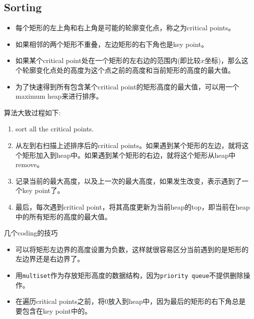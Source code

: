 \subsection{Sorting}
\begin{itemize}
    \item 每个矩形的左上角和右上角是可能的轮廓变化点，称之为critical points。
    \item 如果相邻的两个矩形不重叠，左边矩形的右下角也是key point。
    \item 如果某个critical point处在一个矩形的左右边的范围内(即比较$x$坐标)，那么这个轮廓变化点处的高度为这个点之前的高度和当前矩形的高度的最大值。
    \item 为了快速得到所有包含某个critical point的矩形高度的最大值，可以用一个maximum heap来进行排序。
\end{itemize}
算法大致过程如下:
\begin{enumerate}
    \item sort all the critical points. 
    \item 从左到右扫描上述排序后的critical points。如果遇到某个矩形的左边，就将这个矩形加入到heap中。如果遇到某个矩形的右边，就将这个矩形从heap中remove。
    \item 记录当前的最大高度，以及上一次的最大高度，如果发生改变，表示遇到了一个key point了。
    \item 最后，每次遇到critical point，将其高度更新为当前heap的top，即当前在heap中的所有矩形的高度的最大值。
\end{enumerate}
几个coding的技巧
\begin{itemize}
    \item 可以将矩形左边界的高度设置为负数，这样就很容易区分当前遇到的是矩形的左边界还是右边界了。
    \item 用\texttt{multiset}作为存放矩形高度的数据结构，因为\texttt{priority queue}不提供删除操作。
    \item 在遍历critical points之前，将0放入到heap中，因为最后的矩形的右下角总是要包含在key point中的。
\end{itemize}

